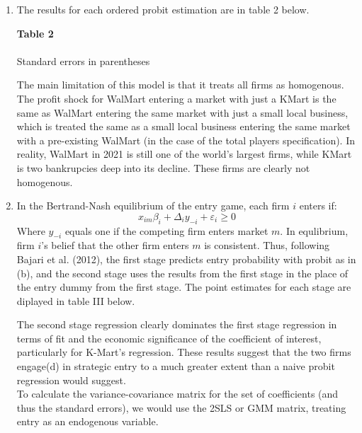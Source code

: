 \documentclass{article}
\begin{document}
\begin{enumerate}

    \item The results for each ordered probit estimation are in table 2 below.
    \begin{center}
        \textbf{Table 2} \\ \medskip
         \\ \smallskip 
        \footnotesize{Standard errors in parentheses}
    \end{center}
    The main limitation of this model is that it treats all firms as homogenous. The profit shock for WalMart entering a market with just a KMart is the same as WalMart entering the same market with just a small local business, which is treated the same as a small local business entering the same market with a pre-existing WalMart (in the case of the total players specification). In reality, WalMart in 2021 is still one of the world's largest firms, while KMart is two bankrupcies deep into its decline. These firms are clearly not homogenous.

    \item In the Bertrand-Nash equilibrium of the entry game, each firm $i$ enters if:\[
      x_{im}\beta_i + \Delta_iy_{-i} + \varepsilon_i\geq 0
    \]
    Where $y_{-i}$ equals one if the competing firm enters market $m$. In equlibrium, firm $i$'s belief that the other firm enters $m$ is consistent. Thus, following Bajari et al. (2012), the first stage predicts entry probability with probit as in (b), and the second stage uses the results from the first stage in the place of the entry dummy from the first stage. The point estimates for each stage are diplayed in table III below. 
    \begin{center}
      
    \end{center}
    The second stage regression clearly dominates the first stage regression in terms of fit and the economic significance of the coefficient of interest, particularly for K-Mart's regression. These results suggest that the two firms engage(d) in strategic entry to a much greater extent than a naive probit regression would suggest. \\
    
    To calculate the variance-covariance matrix for the set of coefficients (and thus the standard errors), we would use the 2SLS or GMM matrix, treating entry as an endogenous variable.
\end{enumerate}
\end{document}
